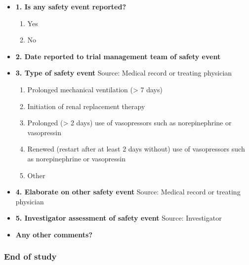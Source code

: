 \documentclass[
]{scrartcl}
\providecommand{\tightlist}{%
  \setlength{\itemsep}{0pt}\setlength{\parskip}{0pt}}\usepackage{longtable,booktabs,array}
\begin{document}
\begin{itemize}
\item
  \textbf{1. Is any safety event reported?}

  \begin{enumerate}
  \def\labelenumi{\arabic{enumi}.}
  \tightlist
  \item
    Yes
  \item
    No
  \end{enumerate}
\item
  \textbf{2. Date reported to trial management team of safety event}
\item
  \textbf{3. Type of safety event} Source: Medical record or treating
  physician

  \begin{enumerate}
  \def\labelenumi{\arabic{enumi}.}
  \tightlist
  \item
    Prolonged mechanical ventilation (\textgreater{} 7 days)
  \item
    Initiation of renal replacement therapy
  \item
    Prolonged (\textgreater{} 2 days) use of vasopressors such as
    norepinephrine or vasopressin
  \item
    Renewed (restart after at least 2 days without) use of vasopressors
    such as norepinephrine or vasopressin
  \item
    Other
  \end{enumerate}
\item
  \textbf{4. Elaborate on other safety event} Source: Medical record or
  treating physician
\item
  \textbf{5. Investigator assessment of safety event} Source:
  Investigator
\item
  \textbf{Any other comments?}
\end{itemize}

\hypertarget{end-of-study}{%
\subsubsection{End of study}\label{end-of-study}}
\end{document}

